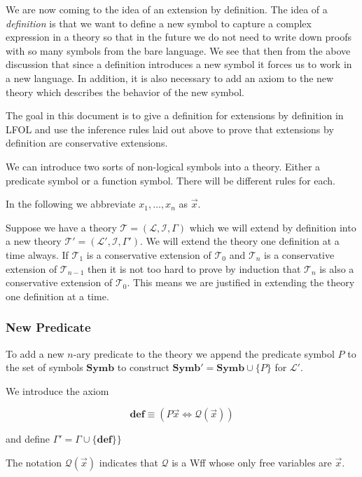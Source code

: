 \documentclass[12pt]{article}
\newcommand{\bv}[1]{\boldsymbol{#1}}
\newcommand{\mc}[1]{\mathcal{#1}}
\newcommand{\bc}[1]{\bv{\mc{#1}}}
\begin{document}
We are now coming to the idea of an extension by definition. The idea of a \textit{definition} is that we want to define a new symbol to capture a complex expression in a theory so that in the future we do not need to write down proofs with so many symbols from the bare language. We see that then from the above discussion that since a definition introduces a new symbol it forces us to work in a new language. In addition, it is also necessary to add an axiom to the new theory which describes the behavior of the new symbol. 

The goal in this document is to give a definition for extensions by definition in LFOL and use the inference rules laid out above to prove that extensions by definition are conservative extensions.

We can introduce two sorts of non-logical symbols into a theory. Either a predicate symbol or a function symbol. There will be different rules for each.

In the following we abbreviate $x_1,\ldots,x_n$ as $\vec{x}$.

Suppose we have a theory $\bc{T} = (\bv{\mc{L}},\bc{I},\Gamma)$ which we will extend by definition into a new theory $\bc{T}' = (\bv{\mc{L}}',\bc{I},\Gamma')$. We will extend the theory one definition at a time always. If $\bc{T}_1$ is a conservative extension of $\bc{T}_0$ and $\bc{T}_n$ is a conservative extension of $\bc{T}_{n-1}$ then it is not too hard to prove by induction that $\bc{T}_n$ is also a conservative extension of $\bc{T}_0$. This means we are justified in extending the theory one definition at a time.

\subsubsection*{New Predicate}

To add a new $n$-ary predicate to the theory we append the predicate symbol $P$ to the set of symbols $\mathbf{Symb}$ to construct $\mathbf{Symb}' = \mathbf{Symb}\cup \{P\}$ for $\bv{\mc{L}}'$.

We introduce the axiom

\begin{equation}
\textbf{def} \equiv (P\vec{x} \iff \mc{Q}(\vec{x}))
\end{equation}

and define $\Gamma' = \Gamma \cup \{\textbf{def}\} \}$

The notation $\mc{Q}(\vec{x})$ indicates that $\mc{Q}$ is a Wff whose only free variables are $\vec{x}$.
\end{document}
